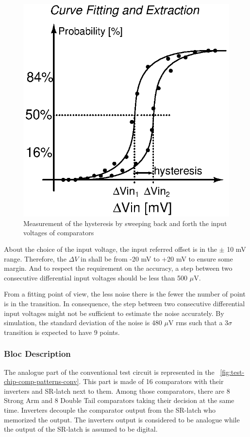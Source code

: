 \begin{figure}[htp]
    \centering
    \includegraphics[width=.3\textwidth]{Chapter5/Figs/comp_test/offset_conv_principle_hyst.ps}
    \caption{Measurement of the hysteresis by sweeping back and forth the input voltages of comparators}
    \label{fig:conv_offset_hyst}
\end{figure}

About the choice of the input voltage, the input referred offset is in the $\pm$ 10 mV range. Therefore, the $\Delta V$ in shall be from -20 mV to +20 mV to ensure some margin. And to respect the requirement on the accuracy, a step between two consecutive differential input voltages should be less than 500 $\mu$V.

From a fitting point of view, the less noise there is the fewer the number of point is in the transition. In consequence, the step between two consecutive differential input voltages might not be sufficient to estimate the noise accurately. By simulation, the standard deviation of the noise is 480 $\mu$V rms such that a 3$\sigma$ transition is expected to have 9 points. 

\subsubsection{Bloc Description}
The analogue part of the conventional test circuit is represented in the \figurename~\ref{fig:test-chip-comp-patterns-conv}. This part is made of 16 comparators with their inverters and SR-latch next to them. Among those comparators, there are 8 Strong Arm and 8 Double Tail comparators taking their decision at the same time. Inverters decouple the comparator output from the SR-latch who memorized the output. The inverters output is considered to be analogue while the output of the SR-latch is assumed to be digital.

